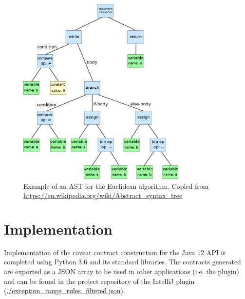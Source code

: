 \begin{figure}
	\label{fig:ast}
	\centering
	\includegraphics[width=0.75\textwidth]{figs/ast.png}
	\caption{Example of an AST for the Euclidean algorithm. Copied from \url{https://en.wikipedia.org/wiki/Abstract\_syntax\_tree}}
\end{figure}

\section{Implementation}
\label{sec:contract-implement}
Implementation of the caveat contract construction for the Java 12 API is completed using Python 3.6 and its standard libraries. The contracts generated are exported as a JSON array to be used in other applications (i.e. the plugin) and can be found in the project repository of the IntelliJ plugin (\url{./exception_range_rules_filtered.json}).

